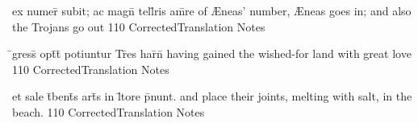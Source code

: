 \latline
  {ex numer\={} subit; ac magn\={} tell\={}ris am\={}re}
  { of {\AE}neas' number, {\AE}neas goes in; and also the Trojans go out}
  {110}
  { CorrectedTranslation }
  { Notes }



\latline
  {\={}gress\={\macron {\i}} opt\={}t\={} potiuntur Tr\={}es har\={}n\={}}
  {  having gained the wished-for land with great love  }
  {110}
  { CorrectedTranslation }
  { Notes }


\latline
  {et sale t\={}bent\={\macron {\i}}s art\={}s in l\={\macron {\i}}tore p\={}nunt.}
  { and place their joints, melting with salt, in the beach. }
  {110}
  { CorrectedTranslation }
  { Notes }

